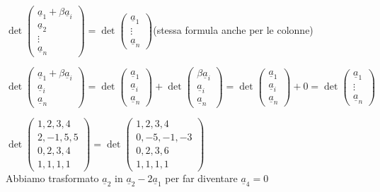 \begin{corollario}
	\phantom{text}\\
	$\det\begin{pmatrix}
		\underline{a}_1+\beta\underline{a}_i\\
		\underline{a}_2\\
		\vdots\\
		\underline{a}_n
	\end{pmatrix}=\det\begin{pmatrix}
		\underline{a}_1\\
		\vdots\\
		\underline{a}_n
	\end{pmatrix}$(stessa formula anche per le colonne)
	\begin{dimostrazione}
		$\det\begin{pmatrix}
			\underline{a}_1+\beta\underline{a}_i\\
			\underline{a}_i\\
			\underline{a}_n
		\end{pmatrix}=\det\begin{pmatrix}
			\underline{a}_1\\
			\underline{a}_i\\
			\underline{a}_n
		\end{pmatrix}+\det\begin{pmatrix}
			\beta\underline{a}_i\\
			\underline{a}_i\\
			\underline{a}_n
		\end{pmatrix}=\det\begin{pmatrix}
			\underline{a}_1\\
			\underline{a}_i\\
			\underline{a}_n
		\end{pmatrix}+0=\det\begin{pmatrix}
			\underline{a}_1\\
			\vdots\\
			\underline{a}_n
		\end{pmatrix}$
	\end{dimostrazione}
	\begin{es}
		$\det\begin{pmatrix}
			1, 2, 3, 4\\
			2, -1, 5, 5\\
			0, 2, 3 ,4\\
			1, 1, 1, 1
		\end{pmatrix}=\det\begin{pmatrix}
			1, 2, 3, 4\\
			0, -5, -1, -3\\
			0, 2, 3, 6\\
			1, 1, 1, 1
		\end{pmatrix}$\\
		Abbiamo trasformato $\underline{a}_2$ in $\underline{a}_2-2\underline{a}_1$  per far diventare $\underline{a}_4=0$
	\end{es}
\end{corollario}















